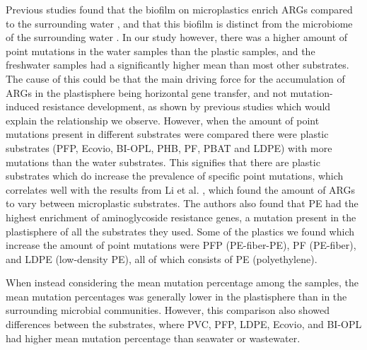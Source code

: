 Previous studies found that the biofilm on microplastics enrich ARGs compared to the surrounding water \cite{zhou2024MicroplasticBiofilmsPromote}, and that this biofilm is distinct from the microbiome of the surrounding water \cite{zadjelovic2023MicrobialHitchhikersHarbouring}. 
In our study however, there was a higher amount of point mutations in the water samples than the plastic samples, and the freshwater samples had a significantly higher mean than most other substrates. 
The cause of this could be that the main driving force for the accumulation of ARGs in the plastisphere being horizontal gene transfer, and not mutation-induced resistance development, as shown by previous studies \cite{goswami2025MicroplasticsHiddenDrivers} which would explain the relationship we observe.
However, when the amount of point mutations present in different substrates were compared there were plastic substrates (PFP, Ecovio, BI-OPL, PHB, PF, PBAT and LDPE) with more mutations than the water substrates.
This signifies that there are plastic substrates which do increase the prevalence of specific point mutations, which correlates well with the results from Li et al. \cite{li2021ImpactUrbanizationAntibiotic}, which found the amount of ARGs to vary between microplastic substrates. The authors also found that PE had the highest enrichment of aminoglycoside resistance genes, a mutation present in the plastisphere of all the substrates they used.
Some of the plastics we found which increase the amount of point mutations were PFP (PE-fiber-PE), PF (PE-fiber), and LDPE (low-density PE), all of which consists of PE (polyethylene). 

When instead considering the mean mutation percentage among the samples, the mean mutation percentages was generally lower in the plastisphere than in the surrounding microbial communities.
However, this comparison also showed differences between the substrates, where PVC, PFP, LDPE, Ecovio, and BI-OPL had higher mean mutation percentage than seawater or wastewater. 

